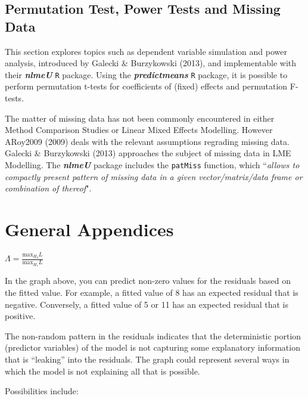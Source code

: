 \documentclass[12pt, a4paper]{report}
\theoremstyle{plain}
\theoremstyle{definition}
\theoremstyle{remark}
\begin{document}
	\section*{Permutation Test, Power Tests and Missing Data }
	
	This section explores topics such as dependent variable simulation and power analysis, introduced by Galecki \& Burzykowski (2013), and implementable with their \textbf{\textit{nlmeU}} \texttt{R} package.
	Using the \textbf{\textit{predictmeans}} \texttt{R} package, it is possible to perform permutation t-tests for coefficients of (fixed) effects and permutation F-tests.
	
	The matter of missing data has not been commonly encountered in either Method Comparison Studies or Linear Mixed Effects Modelling. However ARoy2009 (2009) deals with the relevant assumptions regrading missing data. Galecki \& Burzykowski (2013) approaches the subject of missing data in LME Modelling. The \textbf{\textit{nlmeU}} package includes the \texttt{patMiss} function, which ``\textit{allows to compactly present pattern of missing data in a given vector/matrix/data
		frame or combination of thereof}".
	
	
	
	\chapter{General Appendices}
	$\Lambda = \frac{\mbox{max}_{H_{0}}L}{\mbox{max}_{H_{1}}L}$
	
	
	
	
	In the graph above, you can predict non-zero values for the residuals based on the fitted value. For example, a fitted value of 8 has an expected residual that is negative. Conversely, a fitted value of 5 or 11 has an expected residual that is positive.
	
	The non-random pattern in the residuals indicates that the deterministic portion (predictor variables) of the model is not capturing some explanatory information that is “leaking” into the residuals. The graph could represent several ways in which the model is not explaining all that is possible. 
	
	Possibilities include:
	
\end{document}
